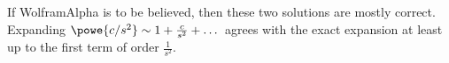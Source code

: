 \documentclass[english, parskip=full]{scrartcl}
\begin{document}
If WolframAlpha is to be believed, then these two solutions are mostly correct. %
Expanding $\powe{c/s^2} \sim 1 + \frac{c}{s^2} + \dots$ agrees with the exact expansion at least up to the first term of order $\frac{1}{s^2}$.
\end{document}
